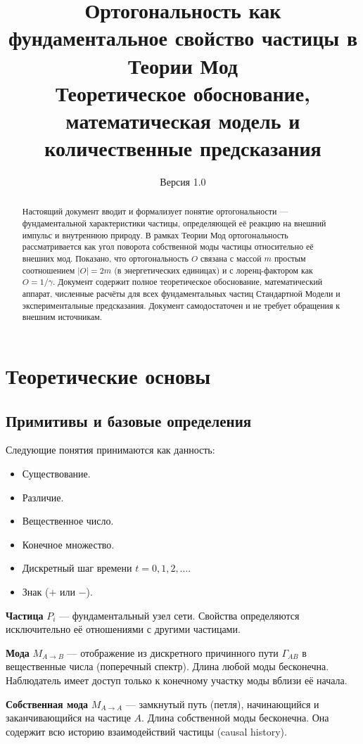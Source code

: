 \documentclass[12pt,a4paper]{article}
\title{\textbf{Ортогональность как фундаментальное свойство частицы в Теории Мод}\\
\large Теоретическое обоснование, математическая модель и количественные предсказания}
\author{}
\date{Версия 1.0}
\begin{document}
\maketitle

\begin{abstract}
Настоящий документ вводит и формализует понятие ортогональности --- фундаментальной характеристики частицы, определяющей её реакцию на внешний импульс и внутреннюю природу. В рамках Теории Мод ортогональность рассматривается как угол поворота собственной моды частицы относительно её внешних мод. Показано, что ортогональность $O$ связана с массой $m$ простым соотношением $|O| = 2m$ (в энергетических единицах) и с лоренц-фактором как $O = 1/\gamma$. Документ содержит полное теоретическое обоснование, математический аппарат, численные расчёты для всех фундаментальных частиц Стандартной Модели и экспериментальные предсказания. Документ самодостаточен и не требует обращения к внешним источникам.
\end{abstract}

\section{Теоретические основы}

\subsection{Примитивы и базовые определения}
Следующие понятия принимаются как данность:
\begin{itemize}
    \item Существование.
    \item Различие.
    \item Вещественное число.
    \item Конечное множество.
    \item Дискретный шаг времени $t = 0, 1, 2, \dots$.
    \item Знак ($+$ или $-$).
\end{itemize}

\textbf{Частица} $P_i$ --- фундаментальный узел сети. Свойства определяются исключительно её отношениями с другими частицами.

\textbf{Мода} $M_{A \to B}$ --- отображение из дискретного причинного пути $\Gamma_{AB}$ в вещественные числа (поперечный спектр). Длина любой моды бесконечна. Наблюдатель имеет доступ только к конечному участку моды вблизи её начала.

\textbf{Собственная мода} $M_{A \to A}$ --- замкнутый путь (петля), начинающийся и заканчивающийся на частице $A$. Длина собственной моды бесконечна. Она содержит всю историю взаимодействий частицы (causal history).
\end{document}
